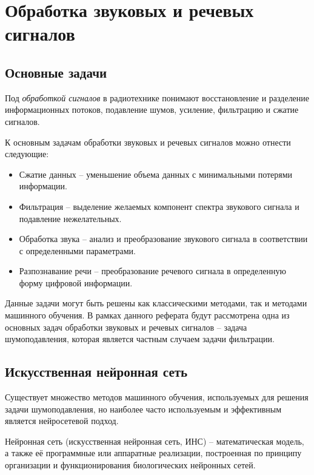 \section{Обработка звуковых и речевых сигналов}

\subsection{Основные задачи}

Под \emph{обработкой сигналов} в радиотехнике понимают
восстановление и разделение информационных потоков,
подавление шумов, усиление, фильтрацию и сжатие сигналов.

К основным задачам обработки звуковых и речевых сигналов можно отнести следующие:

\begin{itemize}
    \item Сжатие данных -- уменьшение объема данных с минимальными
    потерями информации.

    \item Фильтрация -- выделение желаемых компонент спектра звукового сигнала
    и подавление нежелательных.

    \item Обработка звука -- анализ и преобразование звукового сигнала в
    соответствии с определенными параметрами.
    
    \item Разпознавание речи -- преобразование речевого сигнала в определенную
    форму цифровой информации.
\end{itemize}

Данные задачи могут быть решены как классическими методами, так и методами
машинного обучения. В рамках данного реферата будут рассмотрена одна из основных задач
обработки звуковых и речевых сигналов -- задача шумоподавления, которая является частным случаем задачи фильтрации.

\subsection{Искусственная нейронная сеть}

Существует множество методов машинного обучения, используемых для решения задачи
шумоподавления, но наиболее часто используемым и эффективным является нейросетевой подход.

Нейронная сеть (искусственная нейронная сеть, ИНС) -- математическая модель, а также её программные
или аппаратные реализации, построенная по принципу организации и функционирования биологических нейронных сетей.


